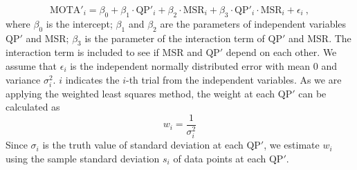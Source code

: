 \begin{equation}
\text{MOTA}'_i = \beta_0 + \beta_1 \cdot \text{QP}'_i + \beta_2 \cdot \text{MSR}_i + \beta_3 \cdot \text{QP}'_i \cdot \text{MSR}_i + \epsilon_i~,
\label{eqn:regression_model}
\end{equation}
where $\beta_0$ is the intercept; $\beta_1$ and $\beta_2$ are the parameters of independent variables $\text{QP}'$ and MSR; $\beta_3$ is the parameter of the interaction term of $\text{QP}'$ and MSR. The interaction term is included to see if MSR and $\text{QP}'$ depend on each other. We assume that $\epsilon_i$ is the independent normally distributed error with mean 0 and variance $\sigma^2_i$. $i$ indicates the $i$-th trial from the independent variables. As we are applying the weighted least squares method, the weight at each $\text{QP}'$ can be calculated as
\begin{equation}
    w_i = \frac{1}{\sigma^2_i}
    \label{eqn:weight}
\end{equation}
Since $\sigma_i$ is the truth value of standard deviation at each $\text{QP}'$, we estimate $w_i$ using the sample standard deviation $s_i$ of data points at each $\text{QP}'$.

